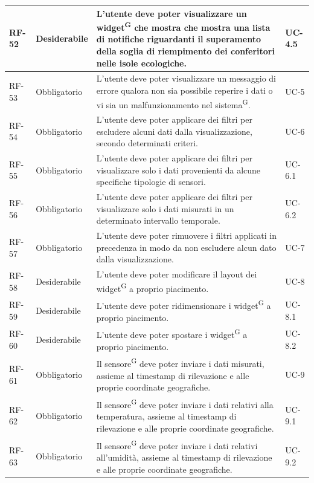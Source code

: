 \documentclass[8pt]{article}
\newcommand{\glossterm}[1]{#1\textsuperscript{G}} %
\begin{document}
\begin{longtable}{|>{\centering\arraybackslash}p{1.2cm}|>{\centering\arraybackslash}p{2cm}|>{\centering\arraybackslash}p{8.5cm}|>{\centering\arraybackslash}p{3cm}|}
            RF-52 & Desiderabile & L'utente deve poter visualizzare un \glossterm{widget} che mostra che mostra una lista di notifiche riguardanti il superamento della soglia di riempimento dei conferitori nelle isole ecologiche. & UC-4.5 \\ \hline
            RF-53 & Obbligatorio & L'utente deve poter visualizzare un messaggio di errore qualora non sia possibile reperire i dati o vi sia un malfunzionamento nel \glossterm{sistema}. & UC-5 \\ \hline
            RF-54 & Obbligatorio & L'utente deve poter applicare dei filtri per escludere alcuni dati dalla visualizzazione, secondo determinati criteri. & UC-6 \\ \hline
            RF-55 & Obbligatorio & L'utente deve poter applicare dei filtri per visualizzare solo i dati provenienti da alcune specifiche tipologie di sensori. & UC-6.1 \\ \hline
            RF-56 & Obbligatorio & L'utente deve poter applicare dei filtri per visualizzare solo i dati misurati in un determinato intervallo temporale. & UC-6.2 \\ \hline
            RF-57 & Obbligatorio & L'utente deve poter rimuovere i filtri applicati in precedenza in modo da non escludere alcun dato dalla visualizzazione. & UC-7 \\ \hline
            RF-58 & Desiderabile & L'utente deve poter modificare il layout dei \glossterm{widget} a proprio piacimento. & UC-8 \\ \hline
            RF-59 & Desiderabile & L'utente deve poter ridimensionare i \glossterm{widget} a proprio piacimento. & UC-8.1 \\ \hline
            RF-60 & Desiderabile & L'utente deve poter spostare i \glossterm{widget} a proprio piacimento. & UC-8.2 \\ \hline
            RF-61 & Obbligatorio & Il \glossterm{sensore} deve poter inviare i dati misurati, assieme al timestamp di rilevazione e alle proprie coordinate geografiche. & UC-9 \\ \hline
            RF-62 & Obbligatorio & Il \glossterm{sensore} deve poter inviare i dati relativi alla temperatura, assieme al timestamp di rilevazione e alle proprie coordinate geografiche. & UC-9.1 \\ \hline
            RF-63 & Obbligatorio & Il \glossterm{sensore} deve poter inviare i dati relativi all'umidità, assieme al timestamp di rilevazione e alle proprie coordinate geografiche. & UC-9.2 \\ \hline

\end{longtable}
\end{document}
